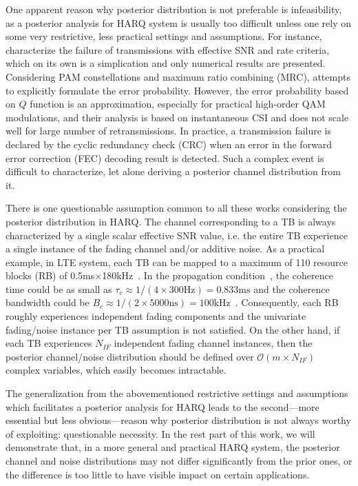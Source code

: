 \documentclass[journal,draftcls,onecolumn,12pt,twoside]{IEEEtran}
\begin{document}
One apparent reason why posterior distribution is not preferable is
infeasibility, as a posterior analysis for HARQ system is usually too difficult
unless one rely on some very restrictive, less practical settings and assumptions. For instance, \cite{gu2006modeling} characterize the failure of
transmissions with effective SNR and rate criteria, which on its own is a
simplication and only numerical results are presented. Considering PAM
constellations and maximum ratio combining (MRC),
\cite{long2012analysis}\cite{alkurd2015modeling} attempts to explicitly
formulate the error probability. However, the error probability based on $Q$
function is an approximation, especially for practical high-order QAM
modulations, and their analysis is based on instantaneous CSI and does not scale
well for large number of retransmissions. In practice, a transmission failure is
declared by the cyclic redundancy check (CRC) when an error in the forward error
correction (FEC) decoding result is detected. Such a complex event is difficult
to characterize, let alone deriving a posterior channel distribution from it.

There is one questionable assumption common to all these works considering the
posterior distribution in HARQ.
The channel corresponding to a TB is always characterized by a single scalar
effective SNR value, i.e. the entire TB experience a single instance of the
fading channel and/or additive noise. As a practical example, in LTE system,
each TB can be mapped to a maximum of 110 resource blocks (RB) of
0.5ms$\times$180kHz~\cite[Table 7.1.7.2.1-1]{ts36.213}.
In the propagation condition~\cite[Table B.2-3]{ts36.141}, the coherence time
could be as small as $\tau_c\approx 1 / (4 \times 300\mbox{Hz}) =
0.833\mbox{ms}$ and the coherence bandwidth could be $B_c\approx 1 / (2 \times
5000\mbox{ns}) = 100\mbox{kHz}$~\cite[Table 2.1]{tse2005fundamentals}.
Consequently, each RB roughly experiences independent fading components and the
univariate fading/noise instance per TB assumption is not satisfied. On the
other hand, if each TB experiences $N_{IF}$ independent fading channel
instances, then the posterior channel/noise distribution should be defined over
$\mathcal{O}(m\times N_{IF})$ complex variables, which easily becomes
intractable.

The generalization from the abovementioned restrictive settings and assumptions 
which facilitates a posterior analysis for HARQ leads to the
second---more essential but less obvious---reason why posterior distribution is
not always worthy of exploiting: questionable necessity. In the rest part of
this work, we will demonstrate that, in a more general and practical HARQ system, the
posterior channel and noise distributions may not differ significantly from the
prior ones, or the difference is too little to have visible
impact on certain applications.
\end{document}
